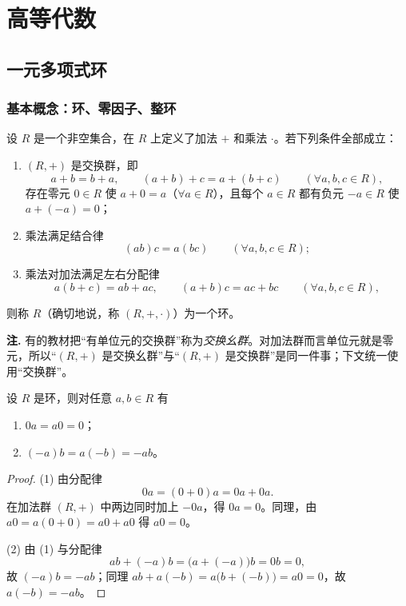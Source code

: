 \section{高等代数}

\subsection{一元多项式环}

\subsubsection{基本概念：环、零因子、整环}

\begin{definition}[环]
设 \(R\) 是一个非空集合，在 \(R\) 上定义了加法 \(+\) 和乘法 \(\cdot\)。若下列条件全部成立：
\begin{enumerate}[label=(\arabic*)]
  \item \((R,+)\) 是交换群，即
  \[
  a+b=b+a,\qquad (a+b)+c=a+(b+c)\qquad(\forall a,b,c\in R),
  \]
  存在零元 \(0\in R\) 使 \(a+0=a\)（\(\forall a\in R\)），且每个 \(a\in R\) 都有负元 \(-a\in R\) 使 \(a+(-a)=0\)；
  \item 乘法满足结合律
  \[
  (ab)c=a(bc)\qquad(\forall a,b,c\in R);
  \]
  \item 乘法对加法满足左右分配律
  \[
  a(b+c)=ab+ac,\qquad (a+b)c=ac+bc\qquad(\forall a,b,c\in R),
  \]
\end{enumerate}
则称 \(R\)（确切地说，称 \((R,+,\cdot)\)）为一个环。
\end{definition}

\noindent\textbf{注.} 有的教材把“有单位元的交换群”称为\emph{交换幺群}。对加法群而言单位元就是零元，所以“\((R,+)\) 是交换幺群”与“\((R,+)\) 是交换群”是同一件事；下文统一使用“交换群”。

\begin{proposition}[环中的基本恒等式]
设 \(R\) 是环，则对任意 \(a,b\in R\) 有
\begin{enumerate}[label=(\arabic*)]
  \item \(0a=a0=0\)；
  \item \((-a)b=a(-b)=-ab\)。
\end{enumerate}
\end{proposition}

\begin{proof}
(1) 由分配律
\[
0a=(0+0)a=0a+0a .
\]
在加法群 \((R,+)\) 中两边同时加上 \(-0a\)，得 \(0a=0\)。同理，由 \(a0=a(0+0)=a0+a0\) 得 \(a0=0\)。

(2) 由 (1) 与分配律
\[
ab+(-a)b=\bigl(a+(-a)\bigr)b=0b=0,
\]
故 \((-a)b=-ab\)；同理 \(ab+a(-b)=a\bigl(b+(-b)\bigr)=a0=0\)，故 \(a(-b)=-ab\)。
\end{proof}


